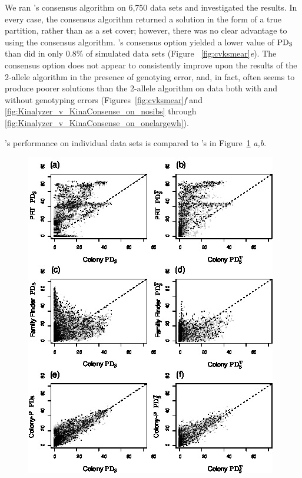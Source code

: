 \documentclass[11pt]{article}
\begin{document}
{We ran \kinalyzer{}'s consensus algorithm on 6,750 data sets and investigated the results.  In every 
case, the consensus algorithm returned a solution in the form of a true partition, rather than as a set 
cover; however, there was no clear advantage to using the consensus algorithm. \kinalyzer{}'s consensus 
option yielded a lower value of $\mathrm{PD_S}$ than \colony{} did in only 0.8\% of simulated data sets (Figure~
\ref{fig:cvksmear}{\em e}).  The consensus option does not appear to consistently  improve upon the 
results of the 2-allele algorithm in the presence of genotying error, and, in fact, often seems to 
produce poorer solutions than the 2-allele algorithm on data both with and without genotyping errors 
(Figures~\ref{fig:cvksmear}{\em f} and \ref{fig:Kinalyzer_v_KinaConsense_on_nosibs} through 
\ref{fig:Kinalyzer_v_KinaConsense_on_onelargewh}). 

\prt{}'s performance on individual data sets is compared to \colony{}'s in Figure~\ref{fig:cvffsmear}
{\em a,b}. 



\begin{figure}
\begin{center}
\includegraphics[width=.9\textwidth]{images/prt_ff_pair_smear.jpg}  %
\end{center}
\caption[Scatterplots comparing performance of \prt{} to \colony{} ({\em a,b}\/), \familyfinder{} 
to \colony{} ({\em c,d}\/), and \colony-P to \colony{} ({\em e,f}\/).  Figures are as in 
Figure~\protect\ref{fig:cvksmear}]{}
\label{fig:cvffsmear}
\end{figure}

}
\end{document}

